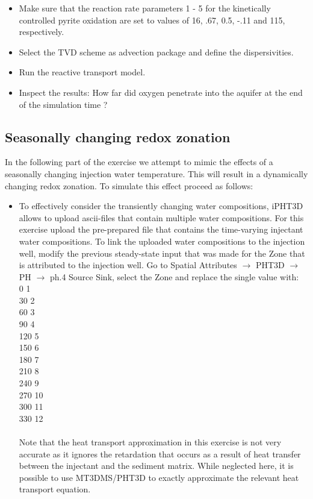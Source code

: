 \begin{itemize}
\item Make sure that the reaction rate parameters 1 - 5 for the kinetically
controlled pyrite oxidation are set to values of 16, .67, 0.5, -.11 and 115, respectively.

\item Select the TVD scheme as advection package and define the dispersivities.

\item Run the reactive transport model.

\item Inspect the results: How far did oxygen penetrate into the aquifer at the end of the simulation time ?

\end{itemize} 

\subsection[Seasonally changing redox zonation]{Seasonally changing redox zonation}

In the following part of the exercise we attempt to mimic the effects of a seasonally changing
injection water temperature. This will result in a dynamically changing redox zonation.
To simulate this effect proceed as follows:

\begin{itemize}

\item To effectively consider the transiently changing water compositions, iPHT3D allows to 
upload ascii-files that contain multiple water compositions.
For this exercise upload the pre-prepared file that contains the time-varying
injectant water compositions. To link the uploaded water compositions to the
injection well, modify the previous steady-state input that was made
for the {\color{blue}Zone} that is attributed to the injection well.
Go to {\color{blue}Spatial Attributes} $\rightarrow$ {\color{blue}PHT3D} $\rightarrow$ {\color{blue}PH} $\rightarrow$ {\color{blue}ph.4 Source \/ Sink}, select the 
{\color{blue}Zone} and replace the single value with: \\
0 1 \\
30 2 \\
60 3 \\
90 4 \\
120 5\\
150 6 \\
180 7 \\
210 8 \\
240 9 \\
270 10 \\
300 11 \\
330 12 \\
\\
Note that the heat transport approximation in this exercise is not very accurate
as it ignores the retardation that occurs as a result of heat transfer between
the injectant and the sediment matrix. 
While neglected here, it is possible to use MT3DMS/PHT3D to exactly approximate 
the relevant heat transport equation. 

\end{itemize}


